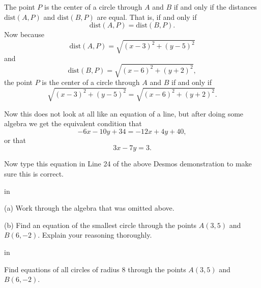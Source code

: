 \documentclass{ximera}
\newcommand{\pskip}{\vskip 0.1 in}
\begin{document}
\begin{explanation}
The point $P$ is the center of a circle through $A$ and $B$ if and only if the distances $\text{dist}(A,P)$ and $\text{dist}(B,P)$ are equal. That is, if and only if
\[
   \text{dist}(A,P)  = \text{dist}(B,P) .
\]
Now because
\[
   \text{dist}(A,P) = \sqrt{(x-3)^2 + (y-5)^2}
\] 
and
\[
  \text{dist}(B,P) = \sqrt{(x-6)^2 + (y+2)^2} ,
\]
the point $P$ is the center of a circle through $A$ and $B$ if and only if
\[
   \sqrt{(x-3)^2 + (y-5)^2} = \sqrt{(x-6)^2 + (y+2)^2} .
\]

Now this does not look at all like an equation of a line, but after doing some algebra we get the equivalent condition that
\[
      -6x -10y + 34 = -12x + 4y +40 ,
\] 
or that 
\[
    3x - 7y = 3 .
\]
 
Now type this equation in Line 24 of the above Desmos demonstration to make sure this is correct.

\end{explanation}

\pskip

 (a) Work through the algebra that was omitted above.

(b) Find an equation of the smallest circle through the points $A(3,5)$ and $B(6,-2)$. Explain your reasoning thoroughly.

\pskip

\begin{example}  \label{Ex6}
Find equations of all circles of radius 8 through the points $A(3,5)$ and $B(6,-2)$.
\end{example}
\end{document}
